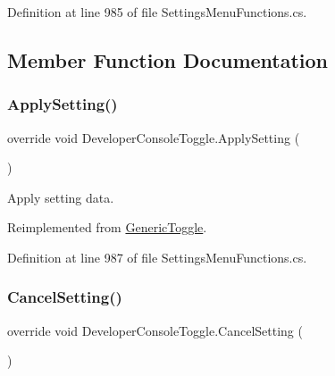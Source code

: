 Definition at line 985 of file Settings\+Menu\+Functions.\+cs.



\subsection{Member Function Documentation}
\mbox{\label{class_developer_console_toggle_a5b3b9f9e622a31e8a1ad4675d920b454}} 
\subsubsection{\texorpdfstring{Apply\+Setting()}{ApplySetting()}}
{\footnotesize\ttfamily override void Developer\+Console\+Toggle.\+Apply\+Setting (\begin{DoxyParamCaption}{ }\end{DoxyParamCaption})\hspace{0.3cm}{\ttfamily [virtual]}}



Apply setting data. 



Reimplemented from \hyperlink{class_generic_toggle_af184e77b892617775fd0785fad7e750a}{Generic\+Toggle}.



Definition at line 987 of file Settings\+Menu\+Functions.\+cs.

\mbox{\label{class_developer_console_toggle_a7621c9152f401719538ba3008f3dcfd2}} 
\subsubsection{\texorpdfstring{Cancel\+Setting()}{CancelSetting()}}
{\footnotesize\ttfamily override void Developer\+Console\+Toggle.\+Cancel\+Setting (\begin{DoxyParamCaption}{ }\end{DoxyParamCaption})\hspace{0.3cm}{\ttfamily [virtual]}}



